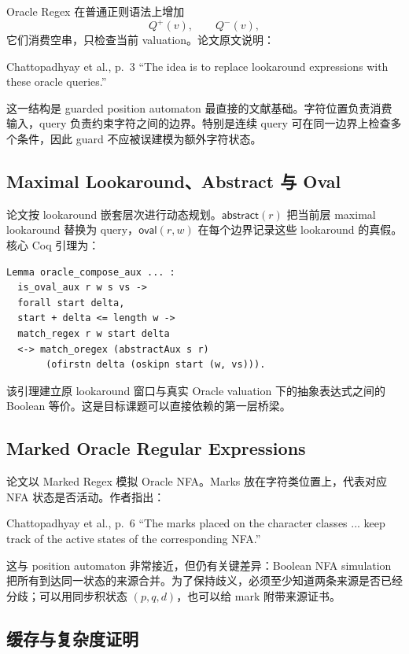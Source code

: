 \documentclass[UTF8,a4paper,12pt]{ctexart}
\newcommand{\ovalfn}{\mathsf{oval}}
\newcommand{\abstractfn}{\mathsf{abstract}}
\begin{document}
Oracle Regex 在普通正则语法上增加
\[
Q^+(v),\qquad Q^-(v),
\]
它们消费空串，只检查当前 valuation。论文原文说明：
\begin{paperquote}{Chattopadhyay et al., p.~3}
``The idea is to replace lookaround expressions with these oracle queries.''
\end{paperquote}

这一结构是 guarded position automaton 最直接的文献基础。字符位置负责消费输入，query 负责约束字符之间的边界。特别是连续 query 可在同一边界上检查多个条件，因此 guard 不应被误建模为额外字符状态。

\subsection{Maximal Lookaround、Abstract 与 Oval}

论文按 lookaround 嵌套层次进行动态规划。$\abstractfn(r)$ 把当前层 maximal lookaround 替换为 query，$\ovalfn(r,w)$ 在每个边界记录这些 lookaround 的真假。核心 Coq 引理为：
\begin{lstlisting}
Lemma oracle_compose_aux ... :
  is_oval_aux r w s vs ->
  forall start delta,
  start + delta <= length w ->
  match_regex r w start delta
  <-> match_oregex (abstractAux s r)
       (ofirstn delta (oskipn start (w, vs))).
\end{lstlisting}
该引理建立原 lookaround 窗口与真实 Oracle valuation 下的抽象表达式之间的 Boolean 等价。这是目标课题可以直接依赖的第一层桥梁。

\subsection{Marked Oracle Regular Expressions}

论文以 Marked Regex 模拟 Oracle NFA。Marks 放在字符类位置上，代表对应 NFA 状态是否活动。作者指出：
\begin{paperquote}{Chattopadhyay et al., p.~6}
``The marks placed on the character classes ... keep track of the active states of the corresponding NFA.''
\end{paperquote}

这与 position automaton 非常接近，但仍有关键差异：Boolean NFA simulation 把所有到达同一状态的来源合并。为了保持歧义，必须至少知道两条来源是否已经分歧；可以用同步积状态 $(p,q,d)$，也可以给 mark 附带来源证书。

\subsection{缓存与复杂度证明}
\end{document}
